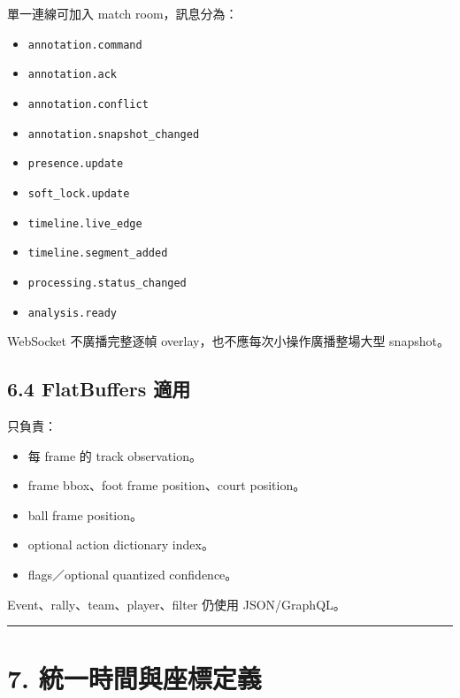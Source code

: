 \documentclass[
  9pt,
  a4paper,
]{article}
\providecommand{\tightlist}{%
  \setlength{\itemsep}{0pt}\setlength{\parskip}{0pt}}
\begin{document}
單一連線可加入 match room，訊息分為：

\begin{itemize}
\tightlist
\item
  \texttt{annotation.command}
\item
  \texttt{annotation.ack}
\item
  \texttt{annotation.conflict}
\item
  \texttt{annotation.snapshot\_\allowbreak{}changed}
\item
  \texttt{presence.update}
\item
  \texttt{soft\_\allowbreak{}lock.update}
\item
  \texttt{timeline.live\_\allowbreak{}edge}
\item
  \texttt{timeline.segment\_\allowbreak{}added}
\item
  \texttt{processing.status\_\allowbreak{}changed}
\item
  \texttt{analysis.ready}
\end{itemize}

WebSocket 不廣播完整逐幀 overlay，也不應每次小操作廣播整場大型
snapshot。

\subsection{6.4 FlatBuffers 適用}\label{64-flatbuffers-ux9069ux7528}

只負責：

\begin{itemize}
\tightlist
\item
  每 frame 的 track observation。
\item
  frame bbox、foot frame position、court position。
\item
  ball frame position。
\item
  optional action dictionary index。
\item
  flags／optional quantized confidence。
\end{itemize}

Event、rally、team、player、filter 仍使用 JSON/GraphQL。

\begin{center}\rule{0.5\linewidth}{0.5pt}\end{center}

\section{7.
統一時間與座標定義}\label{7-ux7d71ux4e00ux6642ux9593ux8207ux5ea7ux6a19ux5b9aux7fa9}
\end{document}
